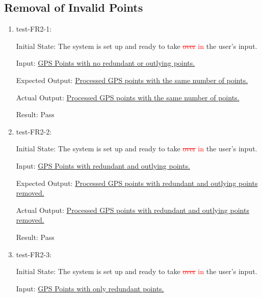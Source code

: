 \documentclass[12pt, titlepage]{article}
\begin{document}
\subsection{Removal of Invalid Points}
\begin{enumerate}
    \item test-FR2-1:\label{test-FR2-1}
    
    Initial State: The system is set up and ready to take \textcolor{red}{\sout{over} in} the user's input.
    
    Input: \href{https://github.com/paezha/PyERT-BLACK/blob/rev0-test/test/test_data/fr-tests/fr2-1-in.csv}{GPS Points with no redundant or outlying points.}
    
    Expected Output: \href{https://github.com/paezha/PyERT-BLACK/blob/rev0-test/test/test_data/fr-tests/fr2-1-expected.csv}{Processed GPS points with the same number of points.}
    
    Actual Output: \href{https://github.com/paezha/PyERT-BLACK/blob/rev0-test/test/test_data/fr-tests/fr2-1-out.csv}{Processed GPS points with the same number of points.}
    
    Result: Pass
    \item test-FR2-2:\label{test-FR2-2}
    
    Initial State: The system is set up and ready to take \textcolor{red}{\sout{over} in} the user's input.
    
    Input: \href{https://github.com/paezha/PyERT-BLACK/blob/rev0-test/test/test_data/fr-tests/fr2-2-in.csv}{GPS Points with redundant and outlying points.}
    
    Expected Output: \href{https://github.com/paezha/PyERT-BLACK/blob/rev0-test/test/test_data/fr-tests/fr2-2-expected.csv}{Processed GPS points with redundant and outlying points removed.}
    
    Actual Output: \href{https://github.com/paezha/PyERT-BLACK/blob/rev0-test/test/test_data/fr-tests/fr2-2-out.csv}{Processed GPS points with redundant and outlying points removed.}
    
    Result: Pass
    \item test-FR2-3:\label{test-FR2-3}
    
    Initial State: The system is set up and ready to take \textcolor{red}{\sout{over} in} the user's input.
    
    Input: \href{https://github.com/paezha/PyERT-BLACK/blob/rev0-test/test/test_data/fr-tests/fr2-3-in.csv}{GPS Points with only redundant points.}
    

\end{enumerate}
\end{document}
